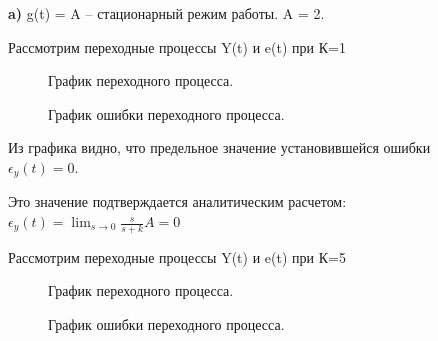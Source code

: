 \documentclass[a4paper, 11pt]{article}
\begin{document}
\normalsize{\textbf{a)} g(t) = A – стационарный режим работы. A = 2.

Рассмотрим переходные процессы Y(t) и e(t) при К=1}

\begin{figure}[h]
    \caption{График переходного процесса.}
    \label{two}
\end{figure}
\begin{figure}[h]
    \caption{График ошибки переходного процесса.}
    \label{tree}
\end{figure}

\newpage

\normalsize{Из графика видно, что предельное значение установившейся ошибки \\ $\epsilon_y(t)=0$.

Это значение подтверждается аналитическим расчетом: \\ $\epsilon_y(t)=\lim_{s\to0}\frac{s}{s+k}A=0$

Рассмотрим переходные процессы Y(t) и e(t) при К=5}

\begin{figure}[h]
    \caption{График переходного процесса.}
    \label{two}
\end{figure}
\begin{figure}[h]
    \caption{График ошибки переходного процесса.}
    \label{tree}
\end{figure}
\end{document}
